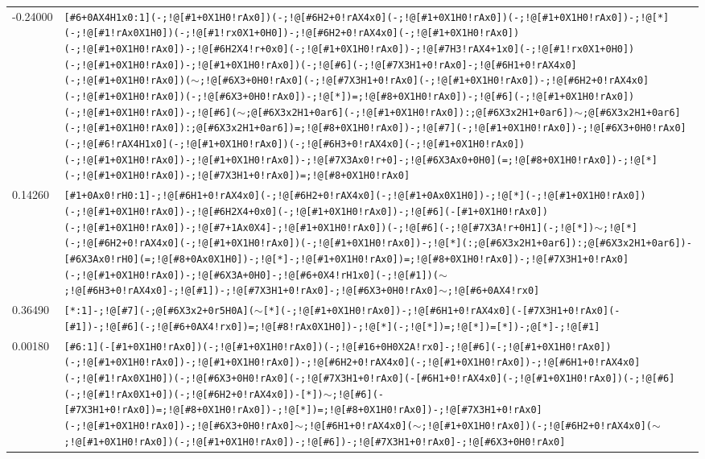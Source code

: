 \begin{longtable}{>{\baselineskip=10pt}p{} >{\baselineskip=10pt}p{}}
-0.24000 & \texttt{[\#6+0AX4H1x0:1](-;!@[\#1+0X1H0!rAx0])(-;!@[\#6H2+0!rAX4x0](-;!@[\#1+0X1H0!rAx0])(-;!@[\#1+0X1H0!rAx0])-;!@[*](-;!@[\#1!rAx0X1H0])(-;!@[\#1!rx0X1+0H0])-;!@[\#6H2+0!rAX4x0](-;!@[\#1+0X1H0!rAx0])(-;!@[\#1+0X1H0!rAx0])-;!@[\#6H2X4!r+0x0](-;!@[\#1+0X1H0!rAx0])-;!@[\#7H3!rAX4+1x0](-;!@[\#1!rx0X1+0H0])(-;!@[\#1+0X1H0!rAx0])-;!@[\#1+0X1H0!rAx0])(-;!@[\#6](-;!@[\#7X3H1+0!rAx0]-;!@[\#6H1+0!rAX4x0](-;!@[\#1+0X1H0!rAx0])($\sim$;!@[\#6X3+0H0!rAx0](-;!@[\#7X3H1+0!rAx0](-;!@[\#1+0X1H0!rAx0])-;!@[\#6H2+0!rAX4x0](-;!@[\#1+0X1H0!rAx0])(-;!@[\#6X3+0H0!rAx0])-;!@[*])=;!@[\#8+0X1H0!rAx0])-;!@[\#6](-;!@[\#1+0X1H0!rAx0])(-;!@[\#1+0X1H0!rAx0])-;!@[\#6]($\sim$;@[\#6X3x2H1+0ar6](-;!@[\#1+0X1H0!rAx0]):;@[\#6X3x2H1+0ar6])$\sim$;@[\#6X3x2H1+0ar6](-;!@[\#1+0X1H0!rAx0]):;@[\#6X3x2H1+0ar6])=;!@[\#8+0X1H0!rAx0])-;!@[\#7](-;!@[\#1+0X1H0!rAx0])-;!@[\#6X3+0H0!rAx0](-;!@[\#6!rAX4H1x0](-;!@[\#1+0X1H0!rAx0])(-;!@[\#6H3+0!rAX4x0](-;!@[\#1+0X1H0!rAx0])(-;!@[\#1+0X1H0!rAx0])-;!@[\#1+0X1H0!rAx0])-;!@[\#7X3Ax0!r+0]-;!@[\#6X3Ax0+0H0](=;!@[\#8+0X1H0!rAx0])-;!@[*](-;!@[\#1+0X1H0!rAx0])-;!@[\#7X3H1+0!rAx0])=;!@[\#8+0X1H0!rAx0]} \\ 
0.14260 & \texttt{[\#1+0Ax0!rH0:1]-;!@[\#6H1+0!rAX4x0](-;!@[\#6H2+0!rAX4x0](-;!@[\#1+0Ax0X1H0])-;!@[*](-;!@[\#1+0X1H0!rAx0])(-;!@[\#1+0X1H0!rAx0])-;!@[\#6H2X4+0x0](-;!@[\#1+0X1H0!rAx0])-;!@[\#6](-[\#1+0X1H0!rAx0])(-;!@[\#1+0X1H0!rAx0])-;!@[\#7+1Ax0X4]-;!@[\#1+0X1H0!rAx0])(-;!@[\#6](-;!@[\#7X3A!r+0H1](-;!@[*])$\sim$;!@[*](-;!@[\#6H2+0!rAX4x0](-;!@[\#1+0X1H0!rAx0])(-;!@[\#1+0X1H0!rAx0])-;!@[*](:;@[\#6X3x2H1+0ar6]):;@[\#6X3x2H1+0ar6])-[\#6X3Ax0!rH0](=;!@[\#8+0Ax0X1H0])-;!@[*]-;!@[\#1+0X1H0!rAx0])=;!@[\#8+0X1H0!rAx0])-;!@[\#7X3H1+0!rAx0](-;!@[\#1+0X1H0!rAx0])-;!@[\#6X3A+0H0]-;!@[\#6+0X4!rH1x0](-;!@[\#1])($\sim$;!@[\#6H3+0!rAX4x0]-;!@[\#1])-;!@[\#7X3H1+0!rAx0]-;!@[\#6X3+0H0!rAx0]$\sim$;!@[\#6+0AX4!rx0]} \\ 
0.36490 & \texttt{[*:1]-;!@[\#7](-;@[\#6X3x2+0r5H0A]($\sim$[*](-;!@[\#1+0X1H0!rAx0])-;!@[\#6H1+0!rAX4x0](-[\#7X3H1+0!rAx0](-[\#1])-;!@[\#6](-;!@[\#6+0AX4!rx0])=;!@[\#8!rAx0X1H0])-;!@[*](-;!@[*])=;!@[*])=[*])-;@[*]-;!@[\#1]} \\ 
0.00180 & \texttt{[\#6:1](-[\#1+0X1H0!rAx0])(-;!@[\#1+0X1H0!rAx0])(-;!@[\#16+0H0X2A!rx0]-;!@[\#6](-;!@[\#1+0X1H0!rAx0])(-;!@[\#1+0X1H0!rAx0])-;!@[\#1+0X1H0!rAx0])-;!@[\#6H2+0!rAX4x0](-;!@[\#1+0X1H0!rAx0])-;!@[\#6H1+0!rAX4x0](-;!@[\#1!rAx0X1H0])(-;!@[\#6X3+0H0!rAx0](-;!@[\#7X3H1+0!rAx0](-[\#6H1+0!rAX4x0](-;!@[\#1+0X1H0!rAx0])(-;!@[\#6](-;!@[\#1!rAx0X1+0])(-;!@[\#6H2+0!rAX4x0])-[*])$\sim$;!@[\#6](-[\#7X3H1+0!rAx0])=;!@[\#8+0X1H0!rAx0])-;!@[*])=;!@[\#8+0X1H0!rAx0])-;!@[\#7X3H1+0!rAx0](-;!@[\#1+0X1H0!rAx0])-;!@[\#6X3+0H0!rAx0]$\sim$;!@[\#6H1+0!rAX4x0]($\sim$;!@[\#1+0X1H0!rAx0])(-;!@[\#6H2+0!rAX4x0]($\sim$;!@[\#1+0X1H0!rAx0])(-;!@[\#1+0X1H0!rAx0])-;!@[\#6])-;!@[\#7X3H1+0!rAx0]-;!@[\#6X3+0H0!rAx0]} \\ 

\end{longtable}
